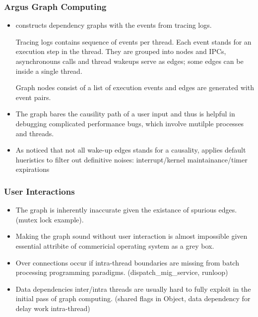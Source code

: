 \subsubsection{Argus Graph Computing}
\begin{itemize}

\item \xxx constructs dependency graphs with the events from tracing logs.

Tracing logs contains sequence of events per thread. Each event stands for an
execution step in the thread. They are grouped into nodes and IPCs, asynchronouns
calls and thread wakeups serve as edges; some edges can be inside a single
thread.

Graph nodes consist of a list of execution events and edges are generated with event
pairs.

\item The graph bares the causility path of a user input and thus is helpful in
debugging complicated performance bugs, which involve mutilple processes and
threads.

\item As noticed that not all wake-up edges stands for a causality, \xxx
applies default hueristics to filter out definitive noises: interrupt/kernel
maintainance/timer expirations

\end{itemize}

\subsubsection{User Interactions}
\begin{itemize}

\item The graph is inherently inaccurate given the existance of spurious edges.
(mutex lock example).

\item Making the graph sound without user interaction is almost impossible given
essential attribite of commericial operating system as a grey box.

\item Over connections occur if intra-thread boundaries are missing from batch
processing programming paradigms. (dispatch\_mig\_service, runloop)

\item Data dependencies inter/intra threads are usually hard to fully exploit in
the initial pass of graph computing. (shared flags in Object, data dependency
for delay work intra-thread)

\end{itemize}
